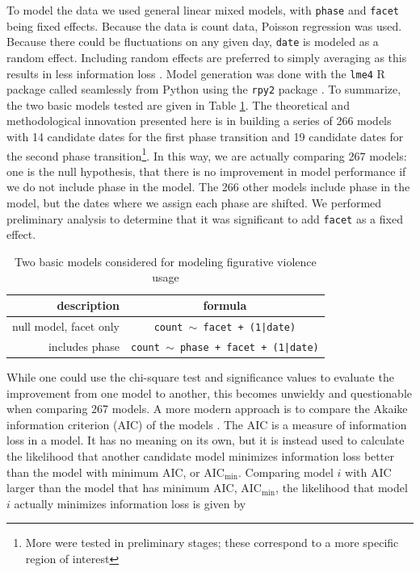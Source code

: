 To model the data we used general linear mixed models, 
with \texttt{phase} and \texttt{facet} 
being fixed effects. Because the data is count data, Poisson regression was
used. Because there could be fluctuations on any given day,
\texttt{date} is modeled as a random effect. Including random effects are
preferred to simply averaging as this results in less information loss
\cite{Winter2013, Burnham2011, Clark1973}. Model generation was done with
the \texttt{lme4} R package \cite{Bates2015} called seamlessly 
from Python using the \texttt{rpy2} package \cite{Gautier2017}. To summarize,
the two basic models tested are given in Table \ref{tab:models}. The 
theoretical and methodological innovation presented here is in building 
a series of 266 models with 14 candidate dates for the first phase transition
and 19 candidate dates for the second phase transition\footnote{More were
tested in preliminary stages; these correspond to a more specific region of
interest}. In this way, we are actually comparing 267 models: one is the null
hypothesis, that there is no improvement in model performance if we do not
include phase in the model. The 266 other models include phase in the model,
but the dates where we assign each phase are shifted. We performed preliminary
analysis to determine that it was significant to add \texttt{facet} as a 
fixed effect.

\begin{table}[ht]
    \centering
    \begin{tabular}{|r|c|}
        \hline
        description & formula \\
        \hline
        null model, facet only & \texttt{count $\sim$ facet + (1|date)} \\
        includes phase       & \texttt{count $\sim$ phase + facet + (1|date)} \\
        \hline
    \end{tabular}
    \caption{Two basic models considered for modeling figurative violence usage}
    \label{tab:models}
\end{table}

While one could use the chi-square test and significance values to evaluate
the improvement from one model to another, this becomes unwieldy and 
questionable when comparing 267 models. A more modern approach is to compare
the Akaike information criterion (AIC) of the models 
\cite{Akaike1974, Burnham2004, Burnham2011}. The AIC is a measure of 
information loss in a model. It has no meaning on its own, but it is instead
used to calculate the likelihood that another candidate model minimizes 
information loss better than the model with minimum AIC, or 
AIC$_{\mathrm{min}}$. Comparing model $i$ with AIC larger than 
the model that has minimum AIC, AIC$_{\mathrm{min}}$, 
the likelihood that model $i$ actually minimizes information loss is given by

